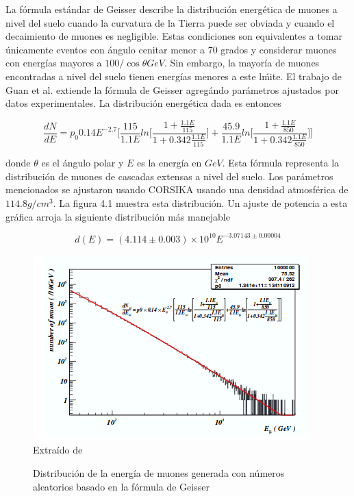 \documentclass{book}
\begin{document}
La fórmula estándar de Geisser describe la distribución energética de muones a nivel del suelo cuando la curvatura de la Tierra puede ser obviada y cuando el decaimiento de muones es negligible. Estas condiciones son equivalentes a tomar \'unicamente eventos con \'angulo cenitar menor a 70 grados y considerar muones con energ\'ias mayores a $100/\cos\theta GeV$. Sin embargo, la mayor\'ia de muones encontradas a nivel del suelo tienen energ\'ias menores a este l\'mite. El trabajo de Guan et al. extiende la f\'ormula de Geisser agreg\'ando par\'ametros ajustados por datos experimentales. La distribuci\'on energ\'etica dada es entonces

\begin{equation}
\frac{dN}{dE}=p_{0}0.14E^{-2.7}\Bigg[\frac{115}{1.1E}ln\Bigg[\frac{1+\frac{1.1E}{115}}{1+0.342\frac{1.1E}{115}}\Bigg]+\frac{45.9}{1.1E}ln\Bigg[\frac{1+\frac{1.1E}{850}}{1+0.342\frac{1.1E}{850}}\Bigg]\Bigg]
\end{equation}

donde $\theta$ es el \'angulo polar y $E$ es la energía en $GeV$. Esta f\'ormula representa la distribuci\'on de muones de cascadas extensas a nivel del suelo. Los par\'ametros mencionados se ajustaron usando CORSIKA usando una densidad atmosf\'erica de $114.8 g/cm^3$. La figura 4.1 muestra esta distribuci\'on. Un ajuste de potencia a esta gr\'afica arroja la siguiente distribuci\'on m\'as manejable \citep{GUAN}

\begin{equation}
d(E)=(4.114\pm0.003)\times10^{10}E^{-3.07143\pm0.00004}
\end{equation}

\begin{figure}[ht] %
\begin{center}
 \includegraphics[]{GeisserMuon.png}
 Extra\'ido de \citep{GUAN}
\caption{Distribuci\'on de la energ\'ia de muones generada con n\'umeros aleatorios basado en la f\'ormula de Geisser}
\end{center}
\end{figure}
\end{document}
